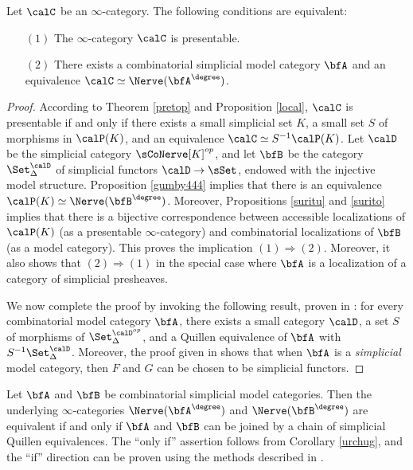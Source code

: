 \begin{Simplicial Categories}
\begin{proposition}\label{notthereyet}
Let $\calC$ be an $\infty$-category. The following conditions are equivalent:
\begin{itemize}
\item[$(1)$] The $\infty$-category $\calC$ is presentable.
\item[$(2)$] There exists a combinatorial simplicial model category $\bfA$ and an equivalence
$\calC \simeq \Nerve( \bfA^{\degree})$. 
\end{itemize}
\end{proposition}

\begin{proof}
According to Theorem \ref{pretop} and Proposition \ref{local}, $\calC$ is presentable if and only if there exists a small simplicial set $K$, a small set $S$ of morphisms in $\calP(K)$, and an equivalence $\calC \simeq S^{-1} \calP(K)$. Let $\calD$ be the simplicial category $\sCoNerve[K]^{op}$, and let $\bfB$ be the category $\Set_{\Delta}^{\calD}$ of 
simplicial functors $\calD \rightarrow \sSet$, endowed with the injective model structure. Proposition \ref{gumby444} implies that there is an equivalence $\calP(K) \simeq \Nerve( \bfB^{\degree})$. Moreover, Propositions \ref{suritu} and \ref{surito} implies that there is a bijective correspondence between accessible localizations of
$\calP(K)$ (as a presentable $\infty$-category) and combinatorial localizations of $\bfB$ (as a model category). This proves the implication $(1) \Rightarrow (2)$. Moreover, it also shows that $(2) 
\Rightarrow (1)$ in the special case where $\bfA$ is a localization of a category of simplicial presheaves. 

We now complete the proof by invoking the following result, proven in \cite{combmodel}: for every combinatorial model category $\bfA$, there exists a small category $\calD$, a set $S$ of morphisms of $\Set^{\calD^{op}}_{\Delta}$, and a Quillen equivalence of $\bfA$ with $S^{-1} \Set_{\Delta}^{\calD}$.
Moreover, the proof given in \cite{combmodel} shows that when $\bfA$ is a {\em simplicial} model category, then $F$ and $G$ can be chosen to be simplicial functors.
\end{proof}

\begin{remark}
Let $\bfA$ and $\bfB$ be combinatorial simplicial model categories. Then the underlying $\infty$-categories $\Nerve( \bfA^{\degree})$ and $\Nerve( \bfB^{\degree})$ are equivalent if and only if $\bfA$ and $\bfB$ can be joined by a chain of simplicial Quillen equivalences. The ``only if'' assertion follows from Corollary \ref{urchug}, and the ``if'' direction can be proven using the methods described in \cite{combmodel}.
\end{remark}


\end{Simplicial Categories}
